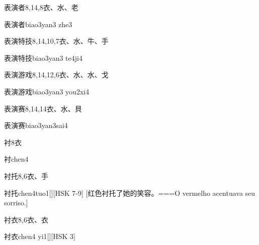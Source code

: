 \begin{Entry}{表演者}{8,14,8}{⾐、⽔、⽼}
  \begin{Phonetics}{表演者}{biao3yan3 zhe3}
  \end{Phonetics}
\end{Entry}

\begin{Entry}{表演特技}{8,14,10,7}{⾐、⽔、⽜、⼿}
  \begin{Phonetics}{表演特技}{biao3yan3 te4ji4}
  \end{Phonetics}
\end{Entry}

\begin{Entry}{表演游戏}{8,14,12,6}{⾐、⽔、⽔、⼽}
  \begin{Phonetics}{表演游戏}{biao3yan3 you2xi4}
  \end{Phonetics}
\end{Entry}

\begin{Entry}{表演赛}{8,14,14}{⾐、⽔、⾙}
  \begin{Phonetics}{表演赛}{biao3yan3sai4}
  \end{Phonetics}
\end{Entry}

\begin{Entry}{衬}{8}{⾐}
  \begin{Phonetics}{衬}{chen4}
  \end{Phonetics}
\end{Entry}

\begin{Entry}{衬托}{8,6}{⾐、⼿}
  \begin{Phonetics}{衬托}{chen4tuo1}[][HSK 7-9]
    [红色衬托了她的笑容。===O vermelho acentuava seu sorriso.]
  \end{Phonetics}
\end{Entry}

\begin{Entry}{衬衣}{8,6}{⾐、⾐}
  \begin{Phonetics}{衬衣}{chen4 yi1}[][HSK 3]
  \end{Phonetics}
\end{Entry}

